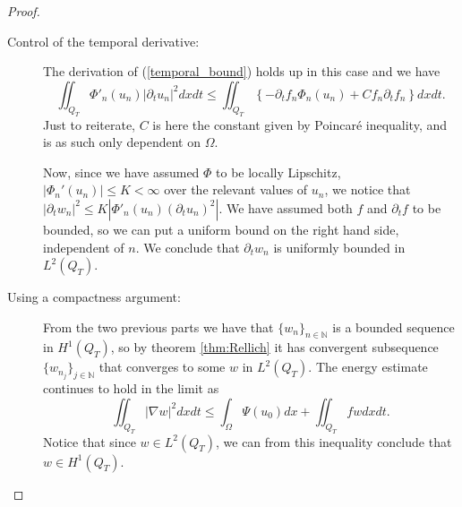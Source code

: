 \documentclass[11pt, a4paper]{article}
\begin{document}
\begin{proof}
\begin{description}
	\item[Control of the temporal derivative:] The derivation of (\ref{temporal_bound}) holds up in this case and we have
	\begin{equation*}
	\iint_{Q_T} \Phi'_n(u_n)|\partial_t u_n|^2 dxdt \leq \iint_{Q_T} \left\{ -\partial_t f_n \Phi_n(u_n) + Cf_n\partial_tf_n \right\} dxdt.
	\end{equation*}
	Just to reiterate, $C$ is here the constant given by Poincaré inequality, and is as such only dependent on $\Omega$. 
	
	Now, since we have assumed $\Phi$ to be locally Lipschitz, $|\Phi_n'(u_n)| \leq K < \infty$ over the relevant values of $u_n$, we notice that $|\partial_t w_n|^2 \leq K|\Phi'_n(u_n) (\partial_t u_n)^2|$. We have assumed both $f$ and $\partial_t f$ to be bounded, so we can put a uniform bound on the right hand side, independent of $n$. We conclude that $\partial_t w_n$ is uniformly bounded in $L^2(Q_T)$.
	
	\item[Using a compactness argument:]From the two previous parts we have that $\{w_n\}_{n \in \mathbb{N}}$ is a bounded sequence in $H^1(Q_T)$, so by theorem \ref{thm:Rellich} it has convergent subsequence $\{w_{n_j}\}_{j \in \mathbb{N}}$ that converges to some $w$ in $L^2(Q_T)$. The energy estimate continues to hold in the limit as
	\begin{equation}
	\iint_{Q_T}|\nabla w|^2 dxdt \leq \int_\Omega \Psi(u_0)dx + \iint_{Q_T}fw dxdt.
	\end{equation}
	Notice that since $w \in L^2(Q_T)$, we can from this inequality conclude that $w \in H^1(Q_T)$.
	

\end{description}
\end{proof}
\end{document}
